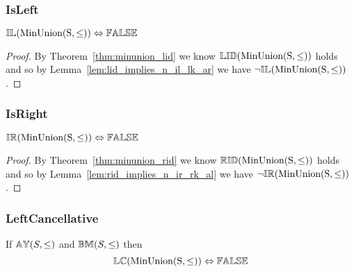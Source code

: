 \documentclass[../Summary.tex]{subfiles}
\begin{document}
\subsubsection{IsLeft}

\begin{theorem} \label{thm:minunion_il}
${\mathbb{IL}}(\mathrm{MinUnion(S,\leq)}) \Leftrightarrow {\mathbb{FALSE}}$
\end{theorem}

\begin{proof}

\vspace{0.5em}

By Theorem~\ref{thm:minunion_lid} we know ${\mathbb{LID}}(\mathrm{MinUnion(S,\leq)})$ holds and so by Lemma~\ref{lem:lid_implies_n_il_lk_ar} we have $\neg {\mathbb{IL}}(\mathrm{MinUnion(S,\leq)})$.
\end{proof}





\subsubsection{IsRight}

\begin{theorem} \label{thm:minunion_ir}
${\mathbb{IR}}(\mathrm{MinUnion(S,\leq)}) \Leftrightarrow {\mathbb{FALSE}}$
\end{theorem}

\begin{proof}

\vspace{0.5em}

By Theorem~\ref{thm:minunion_rid} we know ${\mathbb{RID}}(\mathrm{MinUnion(S,\leq)})$ holds and so by Lemma~\ref{lem:rid_implies_n_ir_rk_al} we have $\neg {\mathbb{IR}}(\mathrm{MinUnion(S,\leq)})$.
\end{proof}





\subsubsection{LeftCancellative}

\begin{theorem} \label{thm:minunion_lc}
If ${\mathbb{AY}}(S, \leq)$ and ${\mathbb{BM}}(S, \leq)$ then
\begin{equation*}
{\mathbb{LC}}(\mathrm{MinUnion(S,\leq)}) \Leftrightarrow {\mathbb{FALSE}}
\end{equation*}
\end{theorem}
\end{document}
